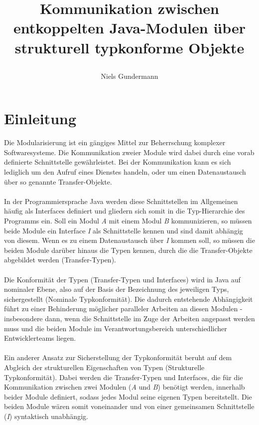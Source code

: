 \documentclass[11pt, 
ngerman,
doublespacing,
chapterinoneline, %
consistentlayout, %
]{scrartcl}
\begin{document}
\author{Niels Gundermann}
\title{Kommunikation zwischen entkoppelten Java-Modulen über strukturell typkonforme Objekte

}
\maketitle
\section{Einleitung}
Die Modularisierung ist ein gängiges Mittel zur Beherrschung komplexer Softwaresys\-teme. Die Kommunikation zweier Module wird dabei durch eine vorab definierte Schnitt\-stelle gewährleistet. Bei der Kommunikation kann es sich lediglich um den Aufruf eines Dienstes handeln, oder um einen Datenaus\-tausch über so genannte Transfer-Objekte.\\\\
In der Programmiersprache Java wer\-den diese Schnittstellen im Allgemeinen häufig als Interfaces definiert und gliedern sich somit in die Typ-Hierarchie des Programms ein. Soll ein Modul \emph{A} mit einem Modul \emph{B}  kommunizieren, so müssen beide Module ein Interface \emph{I} als Schnittstelle kennen und sind damit abhängig von diesem. Wenn es zu einem Datenaustausch über \emph{I} kommen soll, so müssen die beiden Module darüber hinaus die Typen kennen, durch die die Transfer-Objekte abgebildet werden (Transfer-Typen).\\\\
Die Konformität der Typen (Transfer-Typen und Interfaces) wird in Java auf nominaler Ebene, also auf der Basis der Bezeichnung des jeweiligen Typs, sichergestellt (Nominale Typkonformität).
Die dadurch entstehende Abhängigkeit führt zu einer Behinderung möglicher paralleler Arbeiten an diesen Modulen - insbesondere dann, wenn die Schnitt\-stelle im Zuge der Arbeiten angepasst werden muss und die beiden Module im Verantwor\-tungs\-bereich unterschiedlicher Entwicklerteams liegen.\\\\ 
Ein anderer Ansatz zur Sicherstellung der Typkonformität beruht auf dem Abgleich der strukturellen Eigenschaften von Typen (Strukturelle Typkonformität). Dabei werden die Transfer-Typen und Interfaces, die für die Kommunikation zwischen zwei Modulen (\emph{A} und \emph{B}) benötigt werden, innerhalb beider Module definiert, sodass jedes Modul seine eigenen Typen bereitstellt. Die beiden Module wären somit voneinander und von einer gemeinsamen Schnitt\-stelle (\emph{I}) syntaktisch unabhängig.
\end{document}
